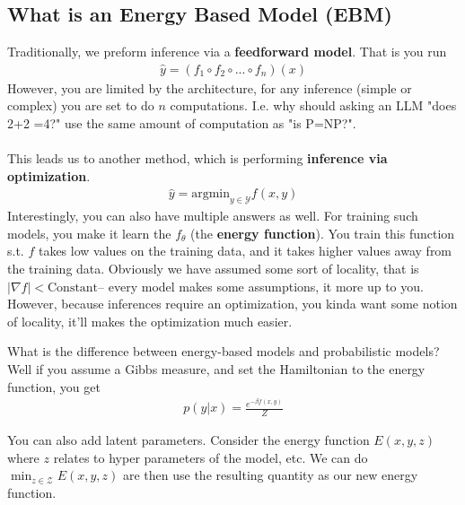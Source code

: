 \subsection{What is an Energy Based Model (EBM)}
Traditionally, we preform inference via a \textbf{feedforward model}. That is you run
\begin{align}
	\hat y  = (f_1 \circ f_2 \circ ... \circ f_n )(x)
\end{align}
However, you are limited by the architecture, for any inference (simple or complex) you are set to do $n$ computations. I.e. why should asking an LLM "does 2+2 =4?" use the same amount of computation as "is P=NP?". 
\\
\\
This leads us to another method, which is performing \textbf{inference via optimization}.
\begin{align}
	\hat y = \text{argmin}_{y \in \mathcal Y} f(x,y)
\end{align}
Interestingly, you can also have multiple answers as well. For training such models, you make it learn the $f_\theta$ (the \textbf{energy function}). You train this function s.t. $f$ takes low values on the training data, and it takes higher values away from the training data. Obviously we have assumed some sort of locality, that is $|\nabla f| <  \text{Constant}$-- every model makes some assumptions, it more up to you. However, because inferences require an optimization, you kinda want some notion of locality, it'll makes the optimization much easier.
\begin{sidework}
	What is the difference between energy-based models and probabilistic models? Well if you assume a Gibbs measure, and set the Hamiltonian to the energy function, you get
	\begin{align}
		p(y |x) = \frac{e^{- \beta f(x,y)}}{Z}
	\end{align}
\end{sidework}
You can also add latent parameters. Consider the energy function $E(x,y,z)$ where $z$ relates to hyper parameters of the model, etc. We can do $\min_{z\in \mathcal Z} E(x,y,z)$ are then use the resulting quantity as our new energy function.


